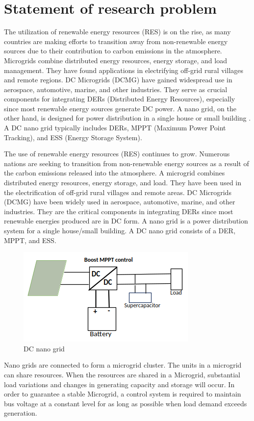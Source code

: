 \section{Statement of research problem}
The utilization of renewable energy resources (RES) is on the rise, as many countries are making efforts to transition away from non-renewable energy sources due to their contribution to carbon emissions in the atmosphere. Microgrids combine distributed energy resources, energy storage, and load management. They have found applications in electrifying off-grid rural villages and remote regions. DC Microgrids (DCMG) have gained widespread use in aerospace, automotive, marine, and other industries. They serve as crucial components for integrating DERs (Distributed Energy Resources), especially since most renewable energy sources generate DC power. A nano grid, on the other hand, is designed for power distribution in a single house or small building \cite{1}. A DC nano grid typically includes DERs, MPPT (Maximum Power Point Tracking), and ESS (Energy Storage System).\par
The use of renewable energy resources (RES) continues to grow. Numerous nations are seeking to transition from non-renewable energy sources as a result of the carbon emissions released into the atmosphere. A microgrid combines distributed energy resources, energy storage, and load. They have been used in the electrification of off-grid rural villages and remote areas. DC Microgrids (DCMG) have been widely used in aerospace, automotive, marine, and other industries. They are the critical components in integrating DERs since most renewable energies produced are in DC form. A nano grid is a power distribution system for a single house/small building. A DC nano grid consists of a DER, MPPT, and ESS.\par

\begin{figure}[H]
	\centering
	\includegraphics[totalheight=6cm]{Figures/dc nano grid.png}
	\caption{DC nano grid}
\end{figure}
Nano grids are connected to form a microgrid cluster. The units in a microgrid can share resources. When the resources are shared in a Microgrid, substantial load variations and changes in generating capacity and storage will occur. In order to guarantee a stable Microgrid, a control system is required to maintain bus voltage at a constant level for as long as possible when load demand exceeds generation.\par

